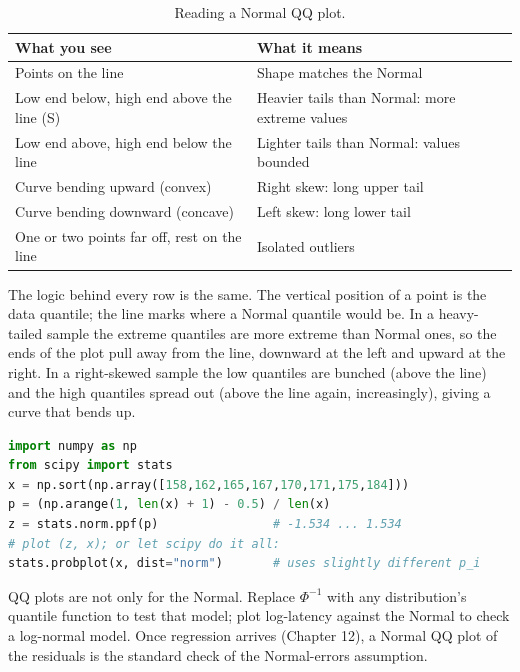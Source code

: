 \begin{table}[H]
\centering
\begin{tabular}{ll}
\toprule
What you see & What it means \\
\midrule
Points on the line & Shape matches the Normal \\
Low end below, high end above the line (S) & Heavier tails than Normal: more extreme values \\
Low end above, high end below the line & Lighter tails than Normal: values bounded \\
Curve bending upward (convex) & Right skew: long upper tail \\
Curve bending downward (concave) & Left skew: long lower tail \\
One or two points far off, rest on the line & Isolated outliers \\
\bottomrule
\end{tabular}
\caption{Reading a Normal QQ plot.}
\label{tab:quantiles-qq-read}
\end{table}

The logic behind every row is the same. The vertical position of a point is the data
quantile; the line marks where a Normal quantile would be. In a heavy-tailed sample the
extreme quantiles are more extreme than Normal ones, so the ends of the plot pull away
from the line, downward at the left and upward at the right. In a right-skewed sample the
low quantiles are bunched (above the line) and the high quantiles spread out (above the
line again, increasingly), giving a curve that bends up.

\begin{lstlisting}[language=Python]
import numpy as np
from scipy import stats
x = np.sort(np.array([158,162,165,167,170,171,175,184]))
p = (np.arange(1, len(x) + 1) - 0.5) / len(x)
z = stats.norm.ppf(p)                # -1.534 ... 1.534
# plot (z, x); or let scipy do it all:
stats.probplot(x, dist="norm")       # uses slightly different p_i
\end{lstlisting}

\begin{connectionbox}
QQ plots are not only for the Normal. Replace $\Phi^{-1}$ with any distribution's
quantile function to test that model; plot log-latency against the Normal to check a
log-normal model. Once regression arrives (Chapter 12), a Normal QQ plot of the
residuals is the standard check of the Normal-errors assumption.
\end{connectionbox}


